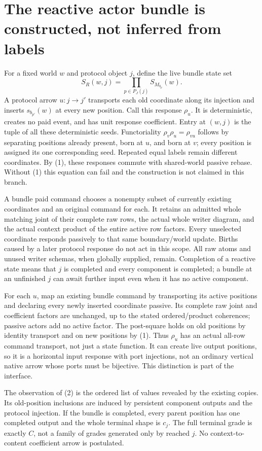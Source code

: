\documentclass[11pt]{article}\usepackage{amsmath,amssymb,amsthm,geometry}\geometry{margin=1in}
\begin{document}
\section{The reactive actor bundle is constructed, not inferred from labels}
For a fixed world $w$ and protocol object $j$, define the live bundle state set
\[
 S_R(w,j)=\prod_{p\in P_J(j)}S_{M_{b_p}}(w).            \tag{2}
\]
A protocol arrow $u:j\to j'$ transports each old coordinate along its injection and inserts $s_{b_{p'}}(w)$ at every new position. Call this response $\rho_u$. It is deterministic, creates no paid event, and has unit response coefficient. Entry at $(w,j)$ is the tuple of all these deterministic seeds. Functoriality $\rho_v\rho_u=\rho_{vu}$ follows by separating positions already present, born at $u$, and born at $v$; every position is assigned its one corresponding seed. Repeated equal labels remain different coordinates. By (1), these responses commute with shared-world passive rebase. Without (1) this equation can fail and the construction is not claimed in this branch.

A bundle paid command chooses a nonempty subset of currently existing coordinates and an original command for each. It retains an admitted whole matching joint of their complete raw rows, the actual whole writer diagram, and the actual context product of the entire active row factors. Every unselected coordinate responds passively to that same boundary/world update. Births caused by a later protocol response do not act in this scope. All raw atoms and unused writer schemas, when globally supplied, remain. Completion of a reactive state means that $j$ is completed and every component is completed; a bundle at an unfinished $j$ can await further input even when it has no active component.

For each $u$, map an existing bundle command by transporting its active positions and declaring every newly inserted coordinate passive. Its complete raw joint and coefficient factors are unchanged, up to the stated ordered/product coherences; passive actors add no active factor. The post-square holds on old positions by identity transport and on new positions by (1). Thus $\rho_u$ has an actual all-row command transport, not just a state function. It can create live output positions, so it is a horizontal input response with port injections, not an ordinary vertical native arrow whose ports must be bijective. This distinction is part of the interface.

The observation of (2) is the ordered list of values revealed by the existing copies. Its old-position inclusions are induced by persistent component outputs and the protocol injection. If the bundle is completed, every parent position has one completed output and the whole terminal shape is $c_j$. The full terminal grade is exactly $C$, not a family of grades generated only by reached $j$. No context-to-content coefficient arrow is postulated.
\end{document}
